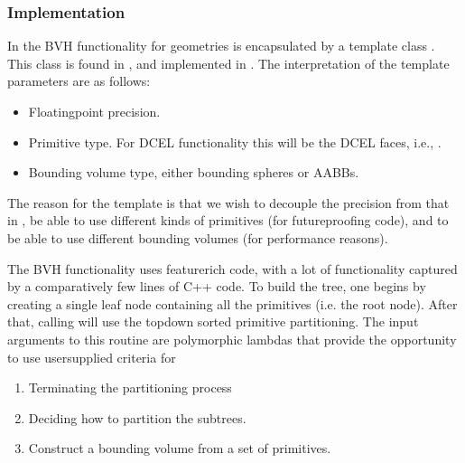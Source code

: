 \documentclass[letterpaper,10pt,english]{sphinxmanual}
\begin{document}
\subsubsection{Implementation}
\label{\detokenize{Utilities/ComplexGeometries:implementation}}
In  the BVH functionality for geometries is encapsulated by a template class .
This class is found in , and implemented in .
The interpretation of the template parameters are as follows:
\begin{itemize}
\item {} 
 Floating\sphinxhyphen{}point precision.

\item {} 
 Primitive type. For DCEL functionality this will be the DCEL faces, i.e., .

\item {} 
 Bounding volume type, either bounding spheres or AABBs.

\end{itemize}

The reason for the template is that we wish to decouple the precision from that in , be able to use different kinds of primitives (for future\sphinxhyphen{}proofing code), and to be able to use different bounding volumes (for performance reasons).

The BVH functionality uses feature\sphinxhyphen{}rich code, with a lot of functionality captured by a comparatively few lines of C++ code.
To build the tree, one begins by creating a single leaf node containing all the primitives (i.e. the root node).
After that, calling  will use the top\sphinxhyphen{}down sorted primitive partitioning.
The input arguments to this routine are polymorphic lambdas that provide the opportunity to use user\sphinxhyphen{}supplied criteria for
\begin{enumerate}
%
\item {} 
Terminating the partitioning process

\item {} 
Deciding how to partition the sub\sphinxhyphen{}trees.

\item {} 
Construct a bounding volume from a set of primitives.

\end{enumerate}
\end{document}
